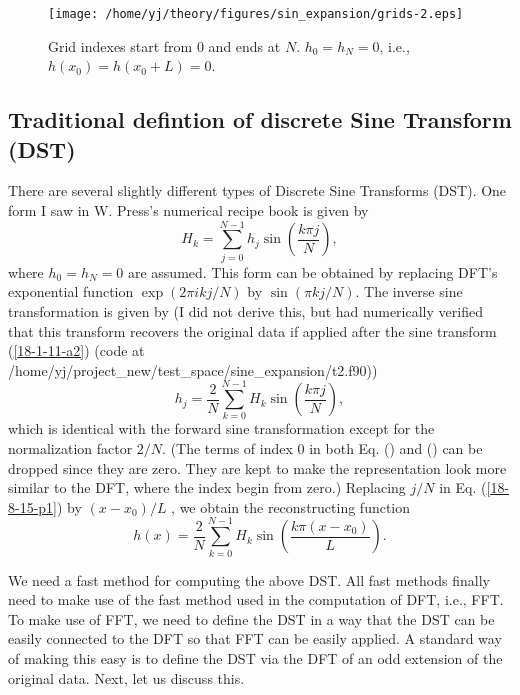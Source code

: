 \documentclass{article}
\begin{document}
\begin{figure}[h]
  \texttt{[image: /home/yj/theory/figures/sin\_expansion/grids-2.eps]}
  \caption{\label{18-8-15-p3}Grid indexes start from $0$ and ends at $N$. $h_0
  = h_N = 0$, i.e., $h (x_0) = h (x_0 + L) = 0$.}
\end{figure}

\subsection{Traditional defintion of discrete Sine Transform (DST)}

There are several slightly different types of Discrete Sine Transforms (DST).
One form I saw in W. Press's numerical recipe book is given by
\begin{equation}
  \label{18-1-11-a2} H_k = \sum_{j = 0}^{N - 1} h_j \sin \left( \frac{k \pi
  j}{N} \right),
\end{equation}
where $h_0 = h_N = 0$ are assumed. This form can be obtained by replacing
DFT's exponential function $\exp (2 \pi i k j / N)$ by $\sin (\pi k j / N)$.
The inverse sine transformation is given by (I did not derive this, but had
numerically verified that this transform recovers the original data if applied
after the sine transform (\ref{18-1-11-a2}) (code at
/home/yj/project\_new/test\_space/sine\_expansion/t2.f90))
\begin{equation}
  \label{18-8-15-p1} h_j = \frac{2}{N} \sum_{k = 0}^{N - 1} H_k \sin \left(
  \frac{k \pi j}{N} \right),
\end{equation}
which is identical with the forward sine transformation except for the
normalization factor $2 / N$. (The terms of index 0 in both Eq. () and () can
be dropped since they are zero. They are kept to make the representation look
more similar to the DFT, where the index begin from zero.) Replacing $j / N$
in Eq. (\ref{18-8-15-p1}) by $(x - x_0) / L$ , we obtain the reconstructing
function
\begin{equation}
  h (x) = \frac{2}{N} \sum_{k = 0}^{N - 1} H_k \sin \left( \frac{k \pi (x -
  x_0)}{L} \right) .
\end{equation}


We need a fast method for computing the above DST. All fast methods finally
need to make use of the fast method used in the computation of DFT, i.e., FFT.
To make use of FFT, we need to define the DST in a way that the DST can be
easily connected to the DFT so that FFT can be easily applied. A standard way
of making this easy is to define the DST via the DFT of an odd extension of
the original data. Next, let us discuss this.
\end{document}
